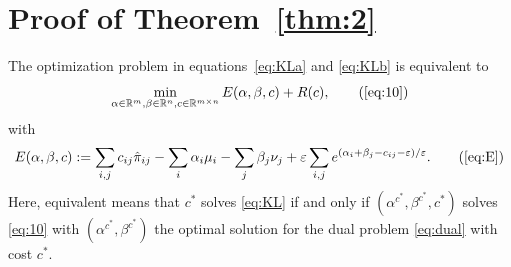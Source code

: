 \section{Proof of Theorem~\ref{thm:2}}
\label{sec:proofthm2}
\begin{theorem}
	The optimization problem in equations~\eqref{eq:KLa} and \eqref{eq:KLb} is equivalent to 
	\begin{equation}
			\min _{\alpha \in \R^m, \beta \in \R^n, c\in \R^{m \times n}} E(\alpha, \beta, c)+R(c), \tag{\ref{eq:10}} 
	\end{equation}
	with 
	\begin{equation}
		E(\alpha, \beta, c) := \sum_{i,j} c_{ij} \pihat_{ij} - \sum_i \alpha_i \mu_i - \sum_j \beta_j \nu_j + \varepsilon \sum_{i,j} e^{(\alpha_i + \beta_j - c_{ij}-\varepsilon)/\varepsilon} . \tag{\ref{eq:E}}
	\end{equation}
	Here, equivalent means that $c^*$ solves \eqref{eq:KL} if and only if $(\alpha^{c^*}, \beta^{c^*}, c^*)$ solves \eqref{eq:10} with $(\alpha^{c^*}, \beta^{c^*})$ the optimal solution for the dual problem \eqref{eq:dual} with cost $c^*$.
\end{theorem}
